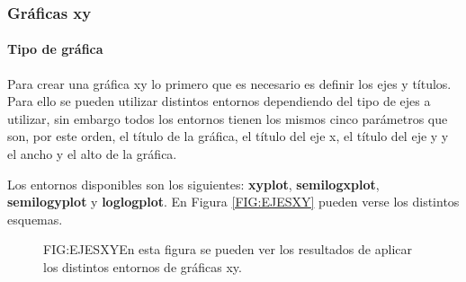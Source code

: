 \subsubsection{Gráficas xy}

\paragraph{Tipo de gráfica}

Para crear una gráfica xy lo primero que es necesario es definir los ejes y títulos. Para ello se pueden utilizar distintos entornos dependiendo del tipo de ejes a utilizar, sin embargo todos los entornos tienen los mismos cinco parámetros que son, por este orden, el título de la gráfica, el título del eje x, el título del eje y y el ancho y el alto de la gráfica.

Los entornos disponibles son los siguientes: \textbf{xyplot}, \textbf{semilogxplot}, \textbf{semilogyplot} y \textbf{loglogplot}. En Figura \ref{FIG:EJESXY} pueden verse los distintos esquemas.

\begin{figure}[Esquemas de ejes de gráficas XY]{FIG:EJESXY}{En esta figura se pueden ver los resultados de aplicar los distintos entornos de gráficas xy.}

\end{figure}

